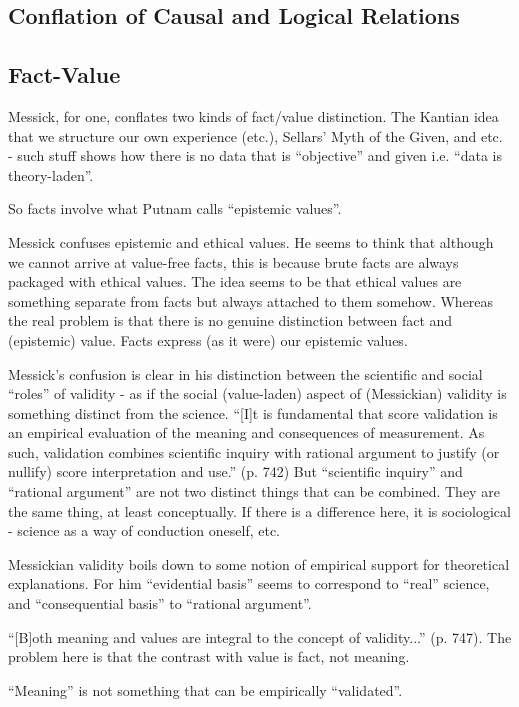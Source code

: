 \documentclass[11pt,twoside]{article}
\begin{document}
\subsection{Conflation of Causal and Logical Relations}


\subsection{Fact-Value}

Messick, for one, conflates two kinds of fact/value distinction.  The
Kantian idea that we structure our own experience (etc.), Sellars'
Myth of the Given, and etc. - such stuff shows how there is no data
that is ``objective'' and given i.e. ``data is theory-laden''.

So facts involve what Putnam calls ``epistemic values''.

Messick confuses epistemic and ethical values.  He seems to think that
although we cannot arrive at value-free facts, this is because brute
facts are always packaged with ethical values.  The idea seems to be
that ethical values are something separate from facts but always
attached to them somehow.  Whereas the real problem is that there is
no genuine distinction between fact and (epistemic) value.  Facts
express (as it were) our epistemic values.

Messick's confusion is clear in his distinction between the scientific
and social ``roles'' of validity - as if the social (value-laden)
aspect of (Messickian) validity is something distinct from the
science.  ``[I]t is fundamental that score validation is an empirical
evaluation of the meaning and consequences of measurement.  As such,
validation combines scientific inquiry with rational argument to
justify (or nullify) score interpretation and use.'' (p. 742) But
``scientific inquiry'' and ``rational argument'' are not two distinct
things that can be combined.  They are the same thing, at least
conceptually.  If there is a difference here, it is sociological -
science as a way of conduction oneself, etc.

Messickian validity boils down to some notion of empirical support for
theoretical explanations.  For him ``evidential basis'' seems to
correspond to ``real'' science, and ``consequential basis'' to
``rational argument''.

``[B]oth meaning and values are integral to the concept of
validity...'' (p. 747).  The problem here is that the contrast with
value is fact, not meaning.

``Meaning'' is not something that can be empirically ``validated''.
\end{document}
